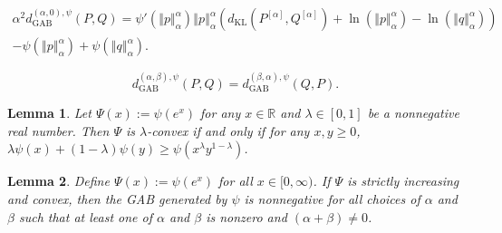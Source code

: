 \documentclass[10pt,a4paper]{amsart}
\newtheorem{lemma}{Lemma}
\def\R{\mathbb{R}}
\newcommand{\dGAB}{d_{\mathrm{GAB}}}
\newcommand{\dKL}{d_{\mathrm{KL}}}
\newcommand{\norm}[1]{\left\Vert #1 \right\Vert}
\begin{document}
\begin{multline}
    \alpha^2 \dGAB^{(\alpha,0),\psi}(P, Q)
    = \psi'(\norm{p}_\alpha^\alpha) \norm{p}_\alpha^\alpha \left( \dKL(P^{[\alpha]}, Q^{[\alpha]}) + \ln(\norm{p}_\alpha^\alpha) - \ln(\norm{q}_\alpha^\alpha) \right)\\
    - \psi(\norm{p}_\alpha^\alpha) + \psi(\norm{q}_\alpha^\alpha).
    \label{eqn:gab-to-kl-bzero}
\end{multline}

          \begin{equation}
              \dGAB^{(\alpha,\beta),\psi}(P, Q) = \dGAB^{(\beta, \alpha),\psi}(Q, P).
              \label{eqn:gab-symmetry}
          \end{equation}

\begin{lemma}\label{lem:geometric-convexity}
    Let $\Psi(x) := \psi(e^x)$ for any $x \in \R$ and $\lambda \in [0, 1]$ be a nonnegative real number. Then $\Psi$ is $\lambda$-convex if and only if for any $x, y \geq 0$, $\lambda \psi(x) + (1 - \lambda) \psi(y) \geq \psi(x^\lambda y^{1-\lambda})$.
\end{lemma}

\begin{lemma}\label{lem:gab-sufficient}
    Define $\Psi(x) := \psi(e^x)$ for all $x \in [0, \infty)$. If $\Psi$ is strictly increasing and convex, then the GAB generated by $\psi$ is nonnegative for all choices of $\alpha$ and $\beta$ such that at least one of $\alpha$ and $\beta$ is nonzero and $(\alpha + \beta) \neq 0$.
\end{lemma}
\end{document}
